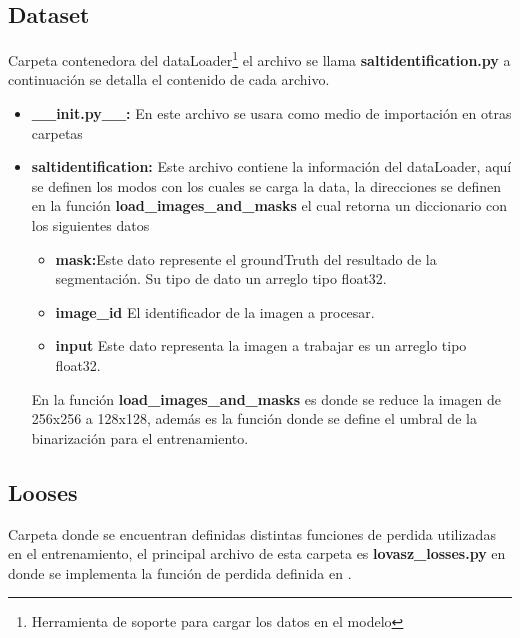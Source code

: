 \subsection{Dataset}
\label{sub:database}
Carpeta contenedora del dataLoader\footnote{Herramienta de soporte para cargar los datos en el modelo} el archivo se llama \textbf{saltidentification.py} a continuación se detalla el contenido de cada archivo.
\begin{itemize}        
    \item \textbf{\_\_init.py\_\_:} En este archivo se usara como medio de importación en otras carpetas
    \item \textbf{saltidentification:} Este archivo contiene la información del dataLoader, aquí se definen los modos con los cuales se carga la data, la direcciones se definen en la función \textbf{load\_images\_and\_masks} el cual retorna un diccionario con los siguientes datos 
    \begin{itemize}
        \item \textbf{mask:}Este dato represente el groundTruth del resultado de la segmentación. Su tipo de dato un arreglo tipo float32.
        \item \textbf{image\_id} El identificador de la imagen a procesar.
        \item \textbf{input} Este dato representa la imagen  a trabajar es un arreglo tipo float32.
        
    \end{itemize}
    
    En la función \textbf{load\_images\_and\_masks} es donde se reduce la imagen de 256x256 a 128x128, además es la función donde se define el umbral de la binarización para el entrenamiento.
\end{itemize}
\subsection{Looses }
Carpeta donde se encuentran definidas distintas funciones de perdida utilizadas en el entrenamiento, el principal archivo de esta carpeta es \textbf{lovasz\_losses.py} en donde se implementa la función de perdida definida en \cite{yu2015lov}.
